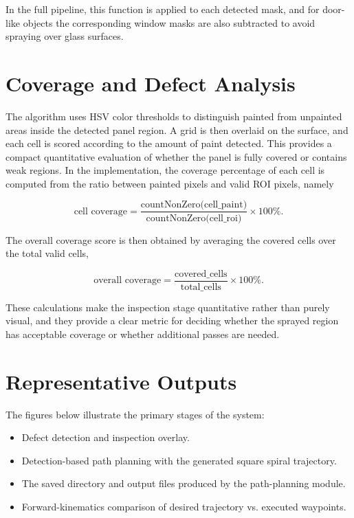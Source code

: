 In the full pipeline, this function is applied to each detected mask, and for door-like objects the corresponding window masks are also subtracted to avoid spraying over glass surfaces.

\section{Coverage and Defect Analysis}
The algorithm uses HSV color thresholds to distinguish painted from unpainted areas inside the detected panel region. A grid is then overlaid on the surface, and each cell is scored according to the amount of paint detected. This provides a compact quantitative evaluation of whether the panel is fully covered or contains weak regions. In the implementation, the coverage percentage of each cell is computed from the ratio between painted pixels and valid ROI pixels, namely

$$
\text{cell coverage} = \frac{\text{countNonZero(cell\_paint)}}{\text{countNonZero(cell\_roi)}} \times 100\%.
$$

The overall coverage score is then obtained by averaging the covered cells over the total valid cells,

$$
\text{overall coverage} = \frac{\text{covered\_cells}}{\text{total\_cells}} \times 100\%.
$$

These calculations make the inspection stage quantitative rather than purely visual, and they provide a clear metric for deciding whether the sprayed region has acceptable coverage or whether additional passes are needed.

\section{Representative Outputs}
The figures below illustrate the primary stages of the system:
\begin{itemize}
  \item Defect detection and inspection overlay.
  \item Detection-based path planning with the generated square spiral trajectory.
  \item The saved directory and output files produced by the path-planning module.
  \item Forward-kinematics comparison of desired trajectory vs. executed waypoints.
\end{itemize}

